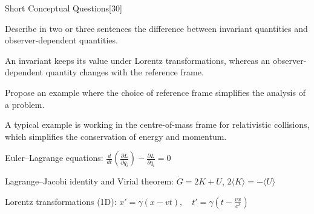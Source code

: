 \documentclass[11pt]{article}
\begin{document}
\begin{examproblems}
\begin{problem}{Short Conceptual Questions}[30]
\begin{questions}

Describe in two or three sentences the difference between invariant quantities and observer-dependent quantities.

\begin{solution}
An invariant keeps its value under Lorentz transformations, whereas an observer-dependent quantity changes with the reference frame.
\end{solution}

Propose an example where the choice of reference frame simplifies the analysis of a problem.

\begin{solution}
A typical example is working in the centre-of-mass frame for relativistic collisions, which simplifies the conservation of energy and momentum.
\end{solution}

\end{questions}
\end{problem}

\end{examproblems}

\begin{formulasheet}
    \item Euler--Lagrange equations: $\frac{d}{dt}\left(\frac{\partial L}{\partial \dot{q}_i}\right) - \frac{\partial L}{\partial q_i} = 0$
    
    \item Lagrange--Jacobi identity and Virial theorem: $\dot{G}=2 K+U$, $2\langle K\rangle=-\langle U\rangle$
    
    \item Lorentz transformations (1D): $x' = \gamma (x - vt), \quad t' = \gamma \left(t - \frac{vx}{c^2}\right)$
\end{formulasheet}

\end{document}
